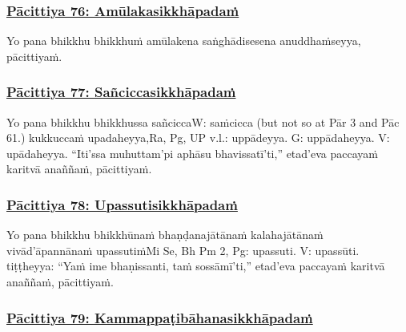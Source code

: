 \subsubsection*{\hyperref[exp76]{Pācittiya 76: Amūlakasikkhāpadaṁ}}
\label{pac76}

Yo pana bhikkhu bhikkhuṁ amūlakena saṅghādisesena anuddhaṁseyya, pācittiyaṁ.



\subsubsection*{\hyperref[exp77]{Pācittiya 77: Sañciccasikkhāpadaṁ}}
\label{pac77}

Yo pana bhikkhu bhikkhussa sañcicca\makeatletter\hyperlink{endnote-appendix}\makeatother W: saṁcicca (but not so at Pār 3 and Pāc 61.) kukkuccaṁ upadaheyya,\makeatletter\hyperlink{endnote-appendix}\makeatother Ra, Pg, UP v.l.: uppādeyya. G: uppādaheyya. V: upādaheyya. ``Iti'ssa muhuttam'pi aphāsu bhavissatī'ti,'' etad'eva paccayaṁ karitvā anaññaṁ, pācittiyaṁ.



\subsubsection*{\hyperref[exp78]{Pācittiya 78: Upassutisikkhāpadaṁ}}
\label{pac78}

Yo pana bhikkhu bhikkhūnaṁ bhaṇḍanajātānaṁ kalahajātānaṁ vivād'āpannānaṁ upassutiṁ\makeatletter\hyperlink{endnote-appendix}\makeatother Mi Se, Bh Pm 2, Pg: upassuti. V: upassūti. tiṭṭheyya: ``Yaṁ ime bhaṇissanti, taṁ sossāmī'ti,'' etad'eva paccayaṁ karitvā anaññaṁ, pācittiyaṁ.



\subsubsection*{\hyperref[exp79]{Pācittiya 79: Kammappaṭibāhanasikkhāpadaṁ}}
\label{pac79}

